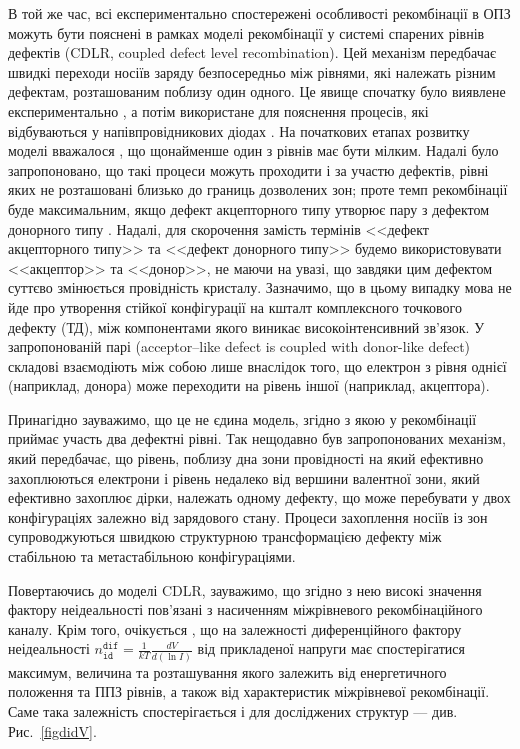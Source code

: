 В той же час, всі експериментально спостережені особливості рекомбінації в ОПЗ можуть бути пояснені в рамках
моделі рекомбінації у системі спарених рівнів дефектів (CDLR, coupled defect level recombination).
Цей механізм передбачає швидкі переходи носіїв заряду безпосередньо між рівнями, які належать різним дефектам,
розташованим поблизу один одного.
Це явище спочатку було виявлене експериментально \cite{DAPR:Chen1991,DAPR:Chen1994},
а потім використане для пояснення процесів, які відбуваються у напівпровідникових діодах \cite{CDLR:JAP1995,CDLR:JAP,CDLR:SSP,Breitenstein2013,CDLR:SupMicr}.
На початкових етапах розвитку моделі вважалося \cite{CDLR:JAP1995}, що щонайменше один з рівнів має бути
мілким.
Надалі було запропоновано, що такі процеси можуть проходити і за участю дефектів, рівні яких не розташовані близько до границь дозволених зон;
проте темп рекомбінації буде максимальним, якщо дефект акцепторного типу утворює пару з дефектом донорного типу \cite{CDLR:JAP}.
Надалі, для скорочення замість термінів <<дефект акцепторного типу>> та <<дефект донорного типу>>
будемо використовувати <<акцептор>> та <<донор>>, не маючи на увазі, що завдяки цим дефектом суттєво змінюється провідність кристалу.
Зазначимо, що в цьому випадку мова не йде про утворення стійкої конфігурації на кшталт комплексного точкового дефекту (ТД),
між компонентами якого виникає високоінтенсивний зв'язок.
У запропонованій парі (acceptor--like defect is coupled with donor-like defect) складові взаємодіють
між собою лише внаслідок того, що електрон з рівня однієї (наприклад, донора) може переходити на рівень іншої (наприклад, акцептора).

Принагідно зауважимо, що це не єдина модель, згідно з якою у рекомбінації приймає участь два
дефектні рівні.
Так нещодавно \cite{TwoLevelRecomb} був запропонованих механізм, який передбачає, що рівень, поблизу дна зони провідності
на який ефективно захоплюються електрони і рівень недалеко від вершини валентної зони, який ефективно захоплює дірки,
належать одному дефекту, що може перебувати у двох конфігураціях залежно від зарядового стану.
Процеси захоплення носіїв із зон супроводжуються швидкою структурною трансформацією дефекту між стабільною та метастабільною конфігураціями.

Повертаючись до моделі CDLR,
зауважимо, що згідно з нею високі значення фактору неідеальності пов'язані з насиченням
міжрівневого рекомбінаційного каналу.
Крім того, очікується \cite{CDLR:JAP,Breitenstein2013}, що
на залежності диференційного фактору неідеальності
$n_\mathtt{id}^\mathtt{dif}=\frac{1}{kT}\frac{dV}{d(\ln I)}$ від прикладеної напруги має
спостерігатися максимум, величина та розташування якого залежить від енергетичного положення та
ППЗ рівнів, а також від характеристик міжрівневої рекомбінації.
Саме така залежність спостерігається і для досліджених структур --- див. Рис.~\ref{figdidV}.

